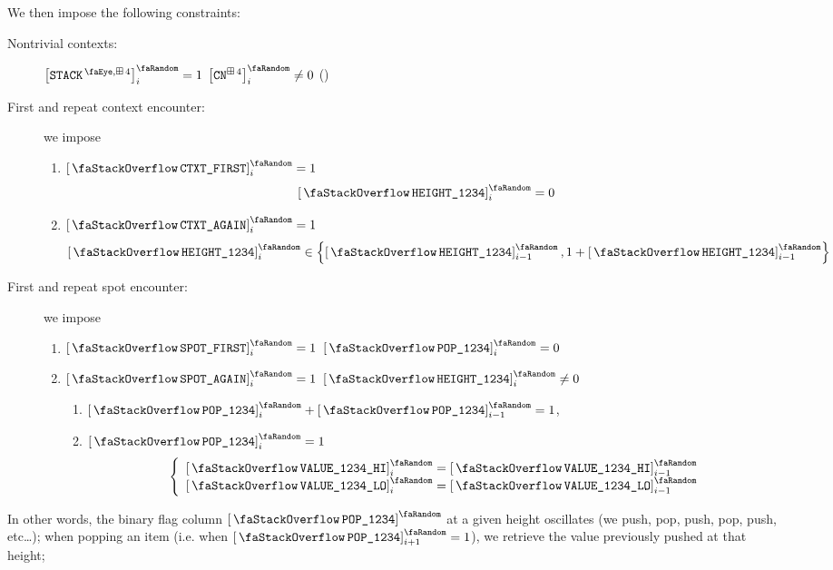 We then impose the following constraints:
\begin{description}
	\item[Nontrivial contexts:] \If $\order{\peekStackFour}_{i} = 1$ \Then $\order{\cn^{\cc4}}_{i} \neq 0$ \quad (\trash)
	\item[First and repeat context encounter:]
		we impose
		\begin{enumerate}
			\item \If $\stackContextFirst_{i} = 1$ \Then
				\[
					\order{\stackItemHeight{\col{1234}}}_{i} = 0
				\]
			\item \If $\stackContextAgain_{i} = 1$ \Then
				\[
					\order{\stackItemHeight{\col{1234}}}_{i}
					\in \left \{ \order{\stackItemHeight{\col{1234}}}_{i - 1}, 1 + \order{\stackItemHeight{\col{1234}}}_{i - 1} \right \}
				\]
		\end{enumerate}
	\item[First and repeat spot encounter:]
		we impose
		\begin{enumerate}
			\item \If $\stackSpotFirst_{i} = 1$ \Then $\order{\stackItemPop{\col{1234}}}_{i} = 0$
			\item \If $\stackSpotAgain_{i} = 1$ \et $\order{\stackItemHeight{\col{1234}}}_{i} \neq 0$ \Then
				\begin{enumerate}
					\item $\order{\stackItemPop{\col{1234}}}_{i} + \order{\stackItemPop{\col{1234}}}_{i - 1} = 1$,
					\item \If $\order{\stackItemPop{\col{1234}}}_{i} = 1$ \Then
						\[
							\left\{ \begin{array}{l}
								\order{\stackItemValHi{\col{1234}}}_{i} = \order{\stackItemValHi{\col{1234}}}_{i - 1} \\
								\order{\stackItemValLo{\col{1234}}}_{i} = \order{\stackItemValLo{\col{1234}}}_{i - 1} \\
							\end{array} \right.
						\]
				\end{enumerate}
		\end{enumerate}
\end{description}
In other words, the binary flag column $\order{\stackItemPop{\col{1234}}}$ at a given height oscillates (we push, pop, push, pop, push, etc\dots{}); when popping an item (i.e. when $\order{\stackItemPop{\col{1234}}}_{i+1} = 1$), we retrieve the value previously pushed at that height;
